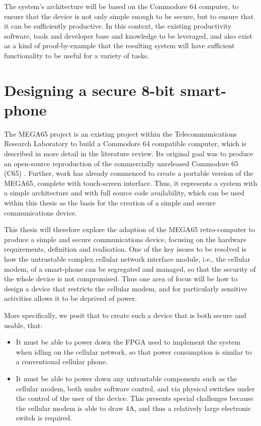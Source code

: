 The system’s architecture will be based on the Commodore 64 computer, to ensure that the device is not only simple enough to be secure, but to ensure that it can be sufficiently productive.
In this context, the existing productivity software, tools and developer base and knowledge to be leveraged, and also exist as a kind of proof-by-example that the resulting system will have sufficient functionality to be useful for a variety of tasks.


\section{Designing a secure 8-bit smart-phone}
\label{sec2}

The MEGA65 project is an existing project within the Telecommunications Research Laboratory to build a Commodore 64 compatible computer, which is described in more detail in the literature review.
Its original goal was to produce an open-source reproduction of the commercially unreleased Commodore 65 (C65) \cite{MEGA65MO64:online}.
Further, work has already commenced to create a portable version of the MEGA65, complete with touch-screen interface.
Thus, it represents a system with a simple architecture and with full source code availability, which can be used within this thesis as the basis for the creation of a simple and secure communications device.

This thesis will therefore explore the adaption of the MEGA65 retro-computer to produce a simple and secure communications device, focusing
on the hardware requirements, definition and realisation.
One of the key issues to be resolved is how the untrustable complex cellular network interface module, i.e., the cellular modem, of a smart-phone can be segregated and managed, so that the security of the whole device is not compromised.
Thus one area of focus will be how to design a device that restricts the cellular modem, and for particularly sensitive activities allows it to be deprived of power.

More specifically, we posit that to create such a device that is both secure and usable, that:
\begin{itemize}
	\item It must be able to power down the FPGA used to implement the system when idling on the cellular network, so that power consumption is similar to a conventional cellular phone.
	\item It must be able to power down any untrustable components such as the cellular modem, both under software control, and via physical switches under the control of the user of the device. This presents special challenges because the cellular modem is able to draw 4A, and thus a relatively large electronic switch is required.
\end{itemize}

